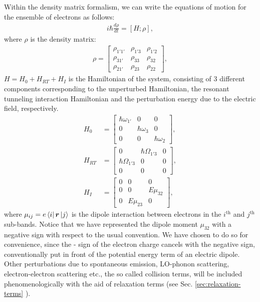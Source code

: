 \documentclass[10pt,english,fleqn]{article}%
\newcommand{\mb}[1]{\bm{#1}}
\begin{document}
Within the density matrix formalism, we can write the equations of motion for the ensemble of electrons as follows:
\begin{align}
 \label{eq:luiville-eqn}
 i\hbar \frac{d \rho}{dt} = [H;\rho] ,
\end{align}
where $\rho$ is the density matrix: 
\begin{align}
 \label{eq:dmatrix-define}
\rho = \begin{bmatrix}
\rho_{1'1'}& \rho_{1'3} & \rho_{1'2} \\
\rho_{31'} & \rho_{33} & \rho_{32} \\
\rho_{21'} & \rho_{23} & \rho_{22}
\end{bmatrix} , 
\end{align}
$H = H_0 + H_{RT} + H_I$ is the Hamiltonian of the system, consisting of 3 different components corresponding to the unperturbed Hamiltonian,
the resonant tunneling interaction Hamiltonian and the perturbation energy due to the electric field, respectively. 
\begin{align}
 \label{eq:hamiltonians}
H_0 &= 
\begin{bmatrix}
\hbar\omega_{1'} & 0 & 0 \\
0  & \hbar\omega_{3} &  0 \\
0  & 0  & \hbar\omega_{2}   
\end{bmatrix} , \nonumber \\
H_{RT} &= \begin{bmatrix}
0  & \hbar\Omega_{1'3}  &  0 \\
\hbar\Omega_{1'3}  & 0  & 0 \\
0  & 0  & 0    
\end{bmatrix} , \nonumber \\ 
H_{I} &=  \begin{bmatrix}
0  & 0  &  0 \\
0 &  0  & E\mu_{32} \\
0  & E\mu_{23} &  0     
\end{bmatrix}, 
\end{align}
where $\mu_{ij} = e\Bra{i} \mb{r} \ket{j}$ is the dipole interaction between electrons in the $i^{\text{th}}$ and  $j^{\text{th}}$ sub-bands. Notice that we have represented the dipole moment $\mu_{32}$ with a negative sign with respect to the usual convention. We have chosen to do so for convenience, since the - sign of the electron charge cancels with the negative sign, conventionally put in front of the potential energy term of an electric dipole.
\\
Other perturbations due to spontaneous emission, LO-phonon scattering, electron-electron scattering etc., the so called collision terms, will be included phenomenologically with the aid of relaxation terms  (see Sec. \ref{sec:relaxation-terms} ). 
\end{document}
